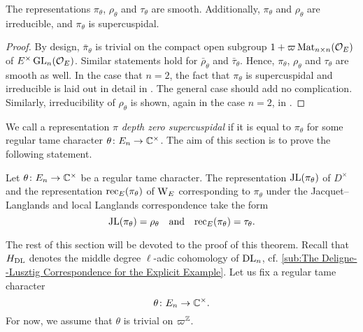\documentclass[../main.tex]{subfiles}
\begin{document}
\begin{lem}\label{lem:BarRepsAreSmooth}
  The representations   $\pi_\theta$, $\rho_\theta$ and $\tau_\theta$ are smooth. 
  Additionally, $\pi_\theta$ and $\rho_\theta$ are irreducible, and
  $\pi_\theta$ is supercuspidal.
  \begin{proof}
    By design, $\bar \pi_\theta$ is trivial on the compact open subgroup $1 +
    \varpi \operatorname{Mat}_{n \times n}(\mathcal{O}_E)$ of $E^\times \operatorname{GL}_n(\mathcal{O}_E)$. Similar
    statements hold for $\bar \rho_\theta$ and $\bar \tau_\theta$. Hence,
    $\pi_\theta$, $\rho_\theta$ and $\tau_\theta$ are smooth as well. 
    In the case that $n=2$, the fact that $\pi_\theta$ is supercuspidal and
    irreducible is laid out in detail in \cite[Section 11]{bushnell2006local}.
    The general case should add no complication. 
    Similarly, irreducibility of $\rho_\theta$ is shown, again in the case 
    $n=2$, in \cite[Section 54]{bushnell2006local}. 
  \end{proof}
\end{lem}

We call a representation $\pi$ \emph{depth zero supercuspidal} if it is equal
to $\pi_\theta$ for some regular tame character $\theta \colon E_n \to \mathbb{C}^\times$. 
The aim of this section is to prove the following statement.
\begin{thm}\label{thm:MainRes1}
  Let $\theta\colon E_n \to \mathbb{C}^\times$ be a regular tame character.
  The representation $\mathrm{JL}(\pi_\theta)$ of $D^\times$ and the representation
  $\mathrm{rec}_E(\pi_\theta)$ of $\mathrm W_E$ corresponding to $\pi_\theta$ under the
  Jacquet--Langlands and local Langlands correspondence take the form
  \begin{equation*}
    \mathrm{JL}(\pi_\theta) = \rho_{\theta}
    \quad \text{and} \quad \mathrm{rec}_E(\pi_\theta) = \tau_\theta.
  \end{equation*}
\end{thm}

The rest of this section will be devoted to the proof of this theorem. 
Recall that $H_{\mathrm{DL}}$ denotes the middle degree $\ell$-adic cohomology of 
$\mathrm{DL}_n$, cf. \cref{sub:The Deligne--Lusztig Correspondence for the
Explicit Example}. Let us fix a regular tame character
$$\theta\colon E_n \to \mathbb{C}^\times.$$ For now, we assume that $\theta$ is
trivial on $\varpi^{\mathbb{Z}}$. 
\end{document}
